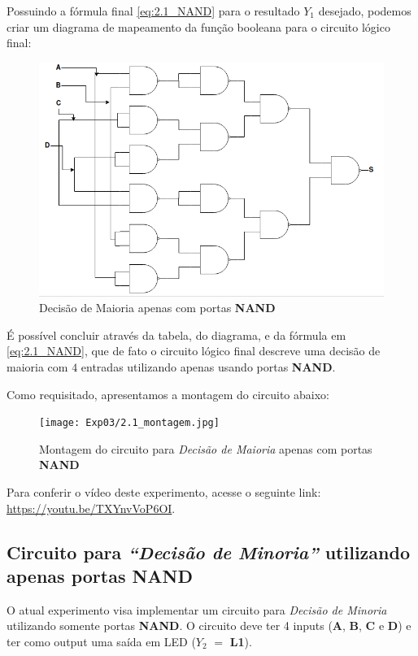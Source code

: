 \documentclass[12pt]{article}
\begin{document}
Possuindo a fórmula final \ref{eq:2.1_NAND} para o resultado \(Y_{1}\) desejado,
podemos criar um diagrama de mapeamento da função booleana para o circuito
lógico final:

\begin{figure}[H]
    \centering
    \includegraphics[width=.85\textwidth]{Exp03/2.1.png}
    \caption{Decisão de Maioria apenas com portas \textbf{NAND}}
    \label{fig:decisao_maioria}
\end{figure}

É possível concluir através da tabela, do diagrama, e da fórmula em
\ref{eq:2.1_NAND}, que de fato o circuito lógico final descreve uma decisão de
maioria com \(4\) entradas utilizando apenas usando portas \textbf{NAND}.

Como requisitado, apresentamos a montagem do circuito abaixo:

\begin{figure}[H]
    \centering
    \texttt{[image: Exp03/2.1\_montagem.jpg]}
    \caption{Montagem do circuito para \textit{Decisão de Maioria} apenas com portas \textbf{NAND}}
    \label{fig:decisao_maioria_montagem}
\end{figure}

Para conferir o vídeo deste experimento, acesse o seguinte link:
\href{https://youtu.be/TXYnvVoP6OI}{https://youtu.be/TXYnvVoP6OI}.
\\[2em]

\subsection{Circuito para \textit{``Decisão de Minoria''} utilizando apenas portas \textbf{NAND}}\label{sec:decisao_minoria}

O atual experimento visa implementar um circuito para \textit{Decisão de
Minoria} utilizando somente portas \textbf{NAND}. O circuito deve ter 4 inputs
(\textbf{A}, \textbf{B}, \textbf{C} e \textbf{D}) e ter como output uma saída em
LED (\(Y_{2}\) \( = \) \textbf{L1}).
\end{document}
